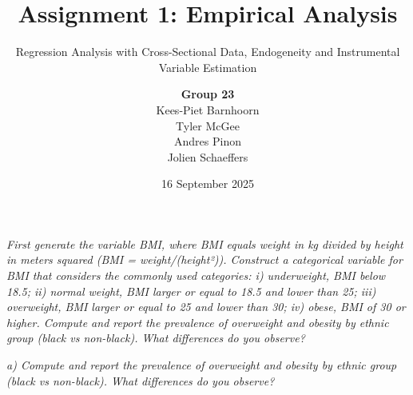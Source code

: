 \documentclass[paper=a4, DIV=10, fontsize=12pt, parskip=full]{scrartcl}
\title{\Large{Assignment 1: Empirical Analysis}}
\subtitle{Regression Analysis with Cross-Sectional Data, Endogeneity and Instrumental Variable Estimation}
\author{\textbf{Group 23}\\[0.5em]
    Kees-Piet Barnhoorn\\
    Tyler McGee\\
    Andres Pinon\\
    Jolien Schaeffers}
\date{16 September 2025}
\newcommand{\question}[3]{\section*{\underbar{Question #1 [#2 points]}}\vspace{-1em}\textit{#3}}
\newcommand{\subquestion}[2]{\textit{#1) #2}}
\begin{document}
\maketitle

\question{1}{0.6}{First generate the variable BMI, where BMI equals weight in kg divided by height in meters squared (BMI = weight/(height²)). Construct a categorical variable for BMI that considers the commonly used categories: i) underweight, BMI below 18.5; ii) normal weight, BMI larger or equal to 18.5 and lower than 25; iii) overweight, BMI larger or equal to 25 and lower than 30; iv) obese, BMI of 30 or higher. Compute and report the prevalence of overweight and obesity by ethnic group (black vs non-black). What differences do you observe?}



\subquestion{a}{Compute and report the prevalence of overweight and obesity by ethnic group (black vs non-black). What differences do you observe?}
\end{document}
